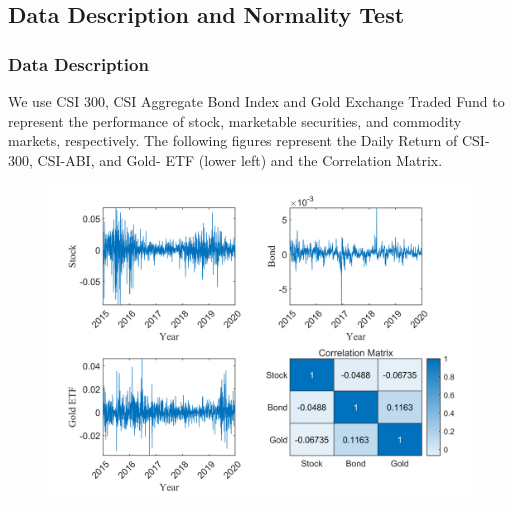 \documentclass{beamer}
\begin{document}
\subsection{Data Description and Normality Test}
\begin{frame}
\frametitle{Data Description}
We use CSI 300, CSI Aggregate Bond Index and Gold Exchange Traded Fund to represent the performance of stock, marketable securities, and commodity markets, respectively. The following figures represent the Daily Return of CSI-300, CSI-ABI, and Gold-
ETF (lower left) and the Correlation Matrix.
\begin{figure}[H]
    \centering
    \includegraphics[scale=0.5]{Figure/FIG1-Daily-Return.png}
    \label{Fig1}
\end{figure}
\end{frame}
\end{document}
